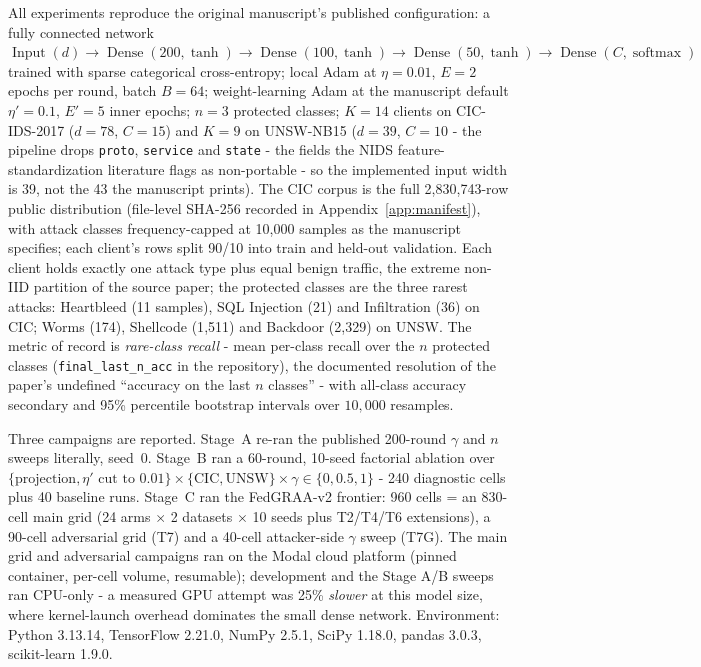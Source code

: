 \documentclass[11pt,a4paper]{report}
\begin{document}
{\sloppy
All experiments reproduce the original manuscript's published
configuration: a fully connected network $\operatorname{Input}(d) \to
\operatorname{Dense}(200,\tanh) \to \operatorname{Dense}(100,\tanh) \to
\operatorname{Dense}(50,\tanh) \to \operatorname{Dense}(C,
\operatorname{softmax})$ trained with sparse categorical cross-entropy;
local Adam at $\eta = 0.01$, $E = 2$ epochs per round, batch $B = 64$;
weight-learning Adam at the manuscript default $\eta' = 0.1$, $E' = 5$
inner epochs; $n = 3$ protected classes; $K = 14$ clients on CIC-IDS-2017
\cite{sharafaldin2018cicids} ($d = 78$, $C = 15$) and $K = 9$ on UNSW-NB15
\cite{moustafa2015unsw} ($d = 39$, $C = 10$ - the pipeline drops
\texttt{proto}, \texttt{service} and \texttt{state} - the fields the NIDS
feature-standardization literature flags as non-portable
\cite{nfuqnidsv2} - so the implemented input width is 39, not the 43 the
manuscript prints). The CIC corpus is the full 2{,}830{,}743-row public
distribution (file-level SHA-256 recorded in Appendix~\ref{app:manifest}),
with attack classes frequency-capped at 10{,}000 samples as the manuscript
specifies; each client's rows split 90/10 into train and held-out
validation. Each
client holds exactly one attack type plus equal benign traffic, the extreme
non-IID partition of the source paper; the protected classes are the three
rarest attacks: Heartbleed (11 samples), SQL Injection (21) and
Infiltration (36) on CIC; Worms (174), Shellcode (1{,}511) and Backdoor
(2{,}329) on UNSW. The metric of record is \emph{rare-class recall} - mean
per-class recall over the $n$ protected classes (\texttt{final\_last\_n\_acc}
in the repository), the documented resolution of the paper's undefined
``accuracy on the last $n$ classes'' - with all-class accuracy secondary
and 95\% percentile bootstrap intervals over $10{,}000$ resamples.\par}

Three campaigns are reported. Stage~A re-ran the published 200-round
$\gamma$ and $n$ sweeps literally, seed~0. Stage~B ran a 60-round, 10-seed
factorial ablation over $\{\text{projection}, \eta' \text{ cut to } 0.01\}
\times \{\text{CIC}, \text{UNSW}\} \times \gamma \in \{0, 0.5, 1\}$ - 240
diagnostic cells plus 40 baseline runs. Stage~C ran the FedGRAA-v2 frontier: 960
cells = an 830-cell main grid (24 arms $\times$ 2 datasets $\times$ 10
seeds plus T2/T4/T6 extensions), a 90-cell adversarial grid (T7) and a
40-cell attacker-side $\gamma$ sweep (T7G). The main grid and adversarial
campaigns ran on the Modal cloud platform (pinned container, per-cell volume,
resumable); development and the Stage A/B sweeps ran CPU-only - a measured
GPU attempt was 25\% \emph{slower} at this model size, where kernel-launch
overhead dominates the small dense network. Environment: Python 3.13.14,
TensorFlow 2.21.0, NumPy 2.5.1, SciPy 1.18.0, pandas 3.0.3, scikit-learn
1.9.0.
\end{document}
